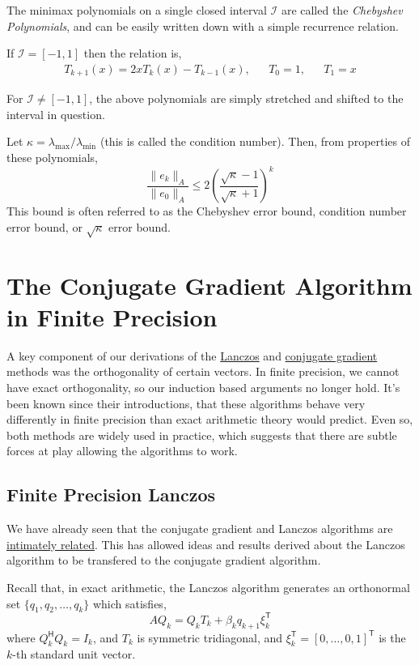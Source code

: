 \documentclass[10pt]{article}
\begin{document}
The minimax polynomials on a single closed interval \(\mathcal{I}\) are called the \emph{Chebyshev Polynomials}, and can be easily written down with a simple recurrence relation.

If \(\mathcal{I} = [-1,1]\) then the relation is,
\begin{align*}
T_{k+1}(x) = 2xT_k(x) - T_{k-1}(x)
,&&
T_0=1
,&&
T_1=x    
\end{align*}

For \(\mathcal{I} \neq [-1,1]\), the above polynomials are simply stretched and shifted to the interval in question.

Let \(\kappa = \lambda_{\text{max}} / \lambda_{\text{min}}\) (this is called the condition number).
Then, from properties of these polynomials,
\[
\frac{\|e_k\|_A}{\|e_0\|_A} \leq 2 \left( \frac{\sqrt{\kappa}-1}{\sqrt{\kappa}+1} \right)^k
\]
This bound is often referred to as the Chebyshev error bound, condition number error bound, or \(\sqrt{\kappa}\) error bound.

\section{The Conjugate Gradient Algorithm in Finite Precision}

A key component of our derivations of the \href{./arnoldi_lanczos.html}{Lanczos} and \href{./cg_derivation.html}{conjugate gradient} methods was the orthogonality of certain vectors.
In finite precision, we cannot have exact orthogonality, so our induction based arguments no longer hold.
It's been known since their introductions, that these algorithms behave very differently in finite precision than exact arithmetic theory would predict.
Even so, both methods are widely used in practice, which suggests that there are subtle forces at play allowing the algorithms to work.

\subsection{Finite Precision Lanczos}

We have already seen that the conjugate gradient and Lanczos algorithms are \href{./cg_lanczos.html}{intimately related}.
This has allowed ideas and results derived about the Lanczos algorithm to be transfered to the conjugate gradient algorithm.

Recall that, in exact arithmetic, the Lanczos algorithm generates an orthonormal set \(\{q_1,q_2,\ldots,q_k\}\) which satisfies,
\[
AQ_k = Q_k T_k + \beta_k q_{k+1} \xi_k^{\mathsf{T}}
\]
where \(Q_k^{\mathsf{H}}Q_k = I_k\), and \(T_k\) is symmetric tridiagonal, and \(\xi_k^{\mathsf{T}} = [0,\ldots,0,1]^{\mathsf{T}}\) is the \(k\)-th standard unit vector.
\end{document}
